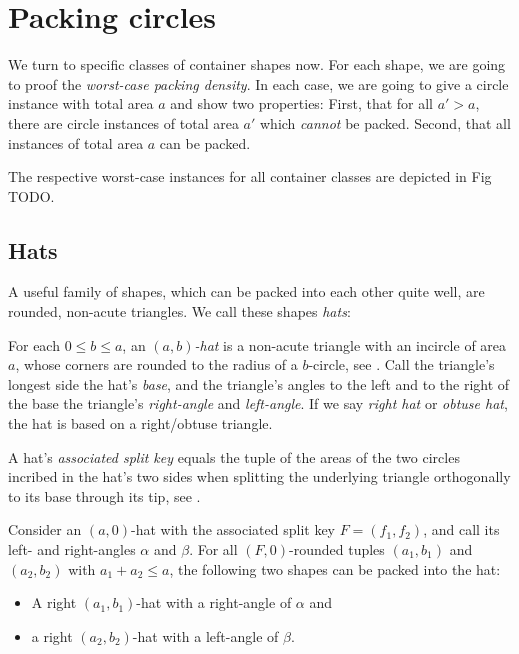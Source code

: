 \documentclass[a4paper,style=print,bibliography=totoc,nexus,lnum,extramargin]{tubsbook}
\begin{document}
\chapter{Packing circles}

We turn to specific classes of container shapes now. For each shape, we are going to proof the \emph{worst-case packing density}. In each case, we are going to give a circle instance with total area $a$ and show two properties: First, that for all $a' > a$, there are circle instances of total area $a'$ which \emph{cannot} be packed. Second, that all instances of total area $a$ can be packed.

The respective worst-case instances for all container classes are depicted in Fig TODO.

\section{Hats}

A useful family of shapes, which can be packed into each other quite well, are rounded, non-acute triangles. We call these shapes \emph{hats}:

\begin{definition}
    For each $0 \le b \le a$, an \emph{$(a,b)$-hat} is a non-acute triangle with an incircle of area $a$, whose corners are rounded to the radius of a $b$-circle, see . Call the triangle's longest side the hat's \emph{base}, and the triangle's angles to the left and to the right of the base the triangle's \emph{right-angle} and \emph{left-angle}.
    If we say \emph{right hat} or \emph{obtuse hat}, the hat is based on a right/obtuse triangle.
\end{definition}

\newcommand\defaulta{30}
\newcommand\defaultb{40}
\newcommand\defaultr{0.2}
\newcommand\defaultx{0.6}


\begin{definition}\label{def:hat-split-key}
    A hat's \emph{associated split key} equals the tuple of the areas of the two circles incribed in the hat's two sides when splitting the underlying triangle orthogonally to its base through its tip, see .
\end{definition}


\begin{lemma}\label{th:hats-in-hat}
    Consider an $(a,0)$-hat with the associated split key $F = (f_1, f_2)$, and call its left- and right-angles $\alpha$ and $\beta$.
    For all $(F,0)$-rounded tuples $(a_1, b_1)$ and $(a_2, b_2)$ with $a_1 + a_2 \le a$, the following two shapes can be packed into the hat:
    \begin{itemize}
        \item A right $(a_1,b_1)$-hat with a right-angle of $\alpha$ and
        \item a right $(a_2,b_2)$-hat with a left-angle of $\beta$.
    \end{itemize}
\end{lemma}
\end{document}
